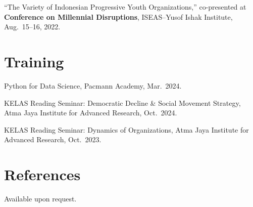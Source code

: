 \documentclass[11pt]{article}
\begin{document}
``The Variety of Indonesian Progressive Youth Organizations,'' co-presented at \textbf{Conference on Millennial Disruptions}, ISEAS--Yusof Ishak Institute, Aug.\ 15--16, 2022.

\section*{Training}
Python for Data Science, Pacmann Academy, Mar.\ 2024.

KELAS Reading Seminar: Democratic Decline \& Social Movement Strategy, Atma Jaya Institute for Advanced Research, Oct.\ 2024.

KELAS Reading Seminar: Dynamics of Organizations, Atma Jaya Institute for Advanced Research, Oct.\ 2023.

\section*{References}
Available upon request.
\end{document}
